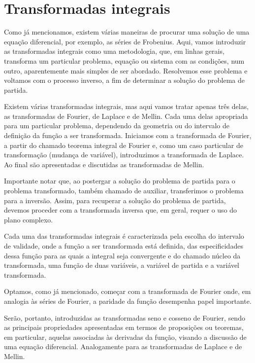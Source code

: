 
\chapter{Transformadas integrais}

Como já mencionamos, existem várias maneiras de procurar uma solução de uma equação diferencial, por exemplo, as séries de Frobenius. Aqui, vamos introduzir as transformadas integrais como uma metodologia, que, em linhas gerais, transforma um particular problema, equação ou sistema com as condições, num outro, aparentemente mais simples de ser abordado. 
Resolvemos esse problema e voltamos com o processo inverso, a fim de determinar a solução do problema de partida.

Existem várias transformadas integrais, mas aqui vamos tratar apenas três delas, as transformadas de Fourier, de Laplace e de Mellin. Cada uma delas apropriada para um particular problema, dependendo da geometria ou do intervalo de definição da função a ser transformada. Iniciamos com a transformada de Fourier, a partir do chamado teorema integral de Fourier e, como um caso particular de transformação (mudança de variável), introduzimos a transformada de Laplace. Ao final são apresentadas e discutidas as transformadas de Mellin.

Importante notar que, ao postergar a solução do problema de partida para o problema transformado, também chamado de auxiliar, transferimos o problema para a inversão. Assim, para recuperar a solução do problema de partida, devemos proceder com a transformada inversa que, em geral, requer o uso do plano complexo.

Cada uma das transformadas integrais é caracterizada pela escolha do intervalo de validade, onde a função a ser transformada está definida, das especificidades dessa função para as quais a integral seja convergente e do chamado núcleo da transformada, uma função de duas variáveis, a variável de partida e a variável transformada.

Optamos, como já mencionado, começar com a transformada de Fourier onde, em analogia às séries de Fourier, a paridade da função desempenha papel importante.

Serão, portanto, introduzidas as transformadas seno e cosseno de Fourier, sendo as principais propriedades apresentadas em termos de proposições ou teoremas, em particular, aquelas associadas às derivadas da função, visando a discussão de uma equação diferencial. Analogamente para as transformadas de Laplace e de Mellin.


